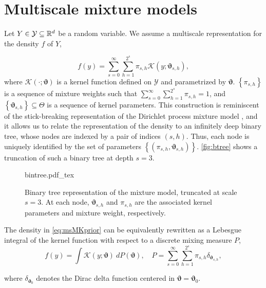 \documentclass[nonatbib]{elsarticle}
\newcommand{\incfig}[2][1]{%
    \def\svgwidth{#1\textwidth}
    {#2.pdf_tex}
}
\begin{document}
\section{Multiscale mixture models}\label{sec:msmk}
Let $Y\in \mathcal{Y} \subseteq \mathbb{R}^{d}$ be a random variable.
We assume a multiscale representation for the density $f$ of $Y$,


\begin{equation}
    \label{eq:msMKprior}
    f(y) = \sum_{s=0}^{\infty }\sum_{h=1}^{2^{s}} \pi_{s,h} \mathcal{K}(y; \bm{\vartheta}_{s,h}),
\end{equation}
where $\mathcal{K}(\cdot ;\bm{\vartheta})$ is a kernel function defined on $\mathcal{Y}$ and parametrized by $\bm{\vartheta}$.
$\left\{ \pi_{s,h} \right\}$ is a sequence of mixture weights such that $\sum_{s=0}^{\infty }\sum_{h=1}^{2^{s}} \pi_{s,h} = 1$, and $\left\{ \bm{\vartheta}_{s,h} \right\} \subseteq \Theta$ is a sequence of kernel parameters.
This construction is reminiscent of the stick-breaking representation of the Dirichlet process mixture model \autocite{ferguson1983}, and it allows us to relate the representation of the density to an infinitely deep binary tree, whose nodes are indexed by a pair of indices $(s, h)$.
Thus, each node is uniquely identified by the set of parameters $\left\{ (\pi_{s,h},\bm{\vartheta}_{s,h})\right\}$.
\autoref{fig:btree} shows a truncation of such a binary tree at depth $s = 3$.



\begin{figure}[htbp]
    \centering
    \fontsize{7pt}{8pt}\selectfont
    \incfig[1]{bintree}
    \caption{Binary tree representation of the mixture model, truncated at scale $s = 3$. At each node, $\bm{\vartheta}_{s,h}$ and $\pi_{s,h}$ are the associated kernel parameters and mixture weight, respectively.}
    \label{fig:btree}
\end{figure}


The density in \eqref{eq:msMKprior} can be equivalently rewritten as a Lebesgue integral of the kernel function with respect to a discrete mixing measure $P$,
\begin{equation}
    \label{eq:msMKpriorLebesgue}
    f(y) = \int \mathcal{K}(y; \bm{\vartheta}) \: dP(\bm{\vartheta}), \quad P = \sum_{s=0}^{\infty }\sum_{h=1}^{2^{s}} \pi_{s,h} \delta_{\bm{\vartheta}_{s,h}},
\end{equation}


where $\delta_{\bm{\vartheta}_0}$ denotes the Dirac delta function centered in $\bm{\vartheta} = \bm{\vartheta}_0$.\\
\end{document}
